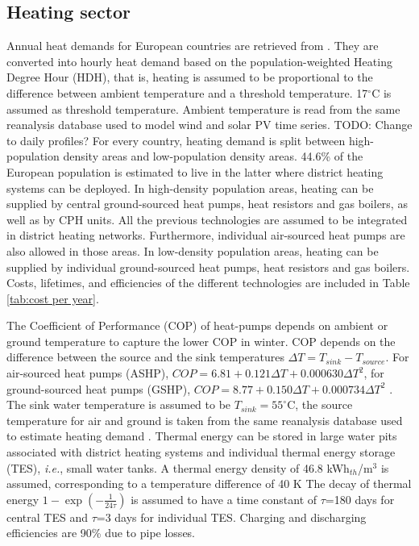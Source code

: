 \documentclass[3p]{elsarticle} %
\begin{document}
\subsection{Heating sector}

Annual heat demands for European countries are retrieved from \cite{HRE}. They are converted into hourly heat demand based on the population-weighted \cite{NUTS3} Heating Degree Hour (HDH), that is, heating is assumed to be proportional to the difference between ambient temperature and a threshold temperature. 17$^{\circ}$C is assumed as threshold temperature. Ambient temperature is read from the same reanalysis database \cite{CFSR} used to model wind and solar PV time series. \textcolor[rgb]{1,0,0}{TODO: Change to daily profiles?} For every country, heating demand is split between high-population density areas and low-population density areas. 44.6\%  of the European population is estimated to live in the latter \cite{Brown_2018} where district heating systems can be deployed.
In high-density population areas, heating can be supplied by central ground-sourced heat pumps, heat resistors and gas boilers, as well as by CPH units. All the previous technologies are assumed to be integrated in district heating networks. Furthermore, individual air-sourced heat pumps are also allowed in those areas. 
In low-density population areas, heating can be supplied by individual ground-sourced heat pumps, heat resistors and gas boilers. Costs, lifetimes, and efficiencies of the different technologies are included in Table \ref{tab:cost per year}. \

The Coefficient of Performance (COP) of heat-pumps depends on ambient or ground temperature to capture the lower COP in winter. COP depends on the difference between the source and the sink temperatures $\Delta T = T_{sink}-T_{source}$. For air-sourced heat pumps (ASHP), $COP= 6.81 + 0.121 \Delta T +  0.000630 \Delta T^2$, for ground-sourced heat pumps (GSHP), $COP=8.77 + 0.150 \Delta T + 0.000734 \Delta T^2$ \cite{Staffell_2012}. The sink water temperature is assumed to be $T_{sink}=55^{\circ}$C, the source temperature for air and ground is taken from the same reanalysis database used to estimate heating demand \cite{CFSR}. Thermal energy can be stored in large water pits associated with district heating systems and individual thermal energy storage (TES), \textit{i.e.}, small water tanks.  A thermal energy density of 46.8 kWh$_{th}$/m$^3$ is assumed, corresponding to a temperature difference of 40 K The decay of thermal energy $1 - \exp(- \frac{1}{24 \tau})$ is assumed to have a time constant of $\tau$=180 days for central TES and $\tau$=3 days for individual TES. Charging and discharging efficiencies are 90\% due to pipe losses.\\
\end{document}

